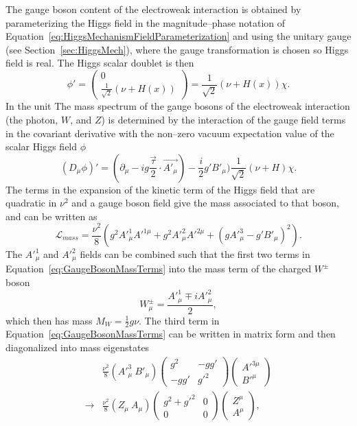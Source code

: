 The gauge boson content of the electroweak interaction is obtained by
parameterizing the Higgs field in the magnitude--phase notation of
Equation~\ref{eq:HiggsMechanismFieldParameterization} and using the unitary
gauge (see Section~\ref{sec:HiggsMech}), where the gauge transformation is
chosen so Higgs field is real.  The Higgs scalar doublet is then 
\begin{equation}
  \phi' =  \left(\begin{array}{c} 0 \\ \frac{1}{\sqrt 2}(\nu +
    H(x))\end{array}\right) = 
    \frac{1}{\sqrt 2}(\nu + H(x))\chi.
    \label{eq:HiggsFieldParameterization}
\end{equation}
In the unit
The mass spectrum of the gauge bosons of the electroweak interaction (the photon, $W$,
and $Z$) is determined by the interaction of the gauge field terms in the
covariant derivative with the non--zero vacuum expectation value of the scalar
Higgs field $\phi$
\begin{equation}
  (D_\mu\phi)' = (\partial_\mu - i g \frac{\vec \tau}{2}\cdot \vec{A'_\mu}) -
  \frac{i}{2}g'B'_\mu)\frac{1}{\sqrt 2}(\nu + H)\chi.
  \nonumber
\end{equation}
The terms in the expansion of the kinetic term of the Higgs field that are
quadratic in $\nu^2$ and a gauge boson field give the mass associated to that
boson, and can be written as
\begin{equation}
  \mathcal{L}_{mass} = \frac{\nu^2}{8}(
  g^2 A'^1_\mu A'^{1\mu} + g^2 A'^2_\mu A'^{2\mu} + (g A'^3_\mu - g'B'_\mu)^2).
  \label{eq:GaugeBosonMassTerms}
\end{equation}
The $A'^1_\mu$ and $A'^2_\mu$ fields can be combined such that the first two
terms in Equation~\ref{eq:GaugeBosonMassTerms} into the mass term of the charged
$W^\pm$ boson
\begin{equation}
  W^\pm_\mu = \frac{A'^{1}_\mu \mp iA'^2_\mu}{2},
\end{equation}
which then has mass $M_W = \frac{1}{2}g\nu$.  The third term in
Equation~\ref{eq:GaugeBosonMassTerms} can be written in matrix form and then
diagonalized into mass eigenstates
\begin{eqnarray}
  &\frac{\nu^2}{8}(A'^3_\mu~B'_\mu) 
  \left(
  \begin{array}{cc}
    g^2 & -gg' \\
    -gg' & g'^2 
  \end{array}
  \right)
  \left(
  \begin{array}{c}
    A'^{3\mu} \\
    B'^\mu
  \end{array}
  \right) \\
  \to & 
  \frac{\nu^2}{8}(Z_\mu~A_\mu) 
  \left(
  \begin{array}{cc}
    g^2 + g'^2  & 0\\
    0 & 0 
  \end{array}
  \right)
  \left(
  \begin{array}{c}
    Z^\mu \\
    A^\mu
  \end{array}
  \right), \nonumber 
\end{eqnarray}
